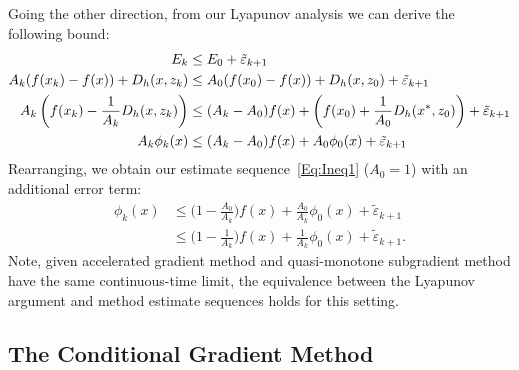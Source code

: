 \documentclass[11pt]{article}
\theoremstyle{plain}
\begin{document}
Going the other direction, from our Lyapunov analysis we can derive the following bound:
\begin{subequations}\label{Eq:EstSeqErr}
\begin{align}
E_k &\leq E_0 + \tilde \varepsilon_{k+1}\\
A_{k}(f(x_{k}) - f(x)) + D_h(x, z_{k}) &\leq A_0 (f(x_0) - f(x)) + D_h(x, z_0) + \tilde \varepsilon_{k+1}\notag\\
A_{k}\left(f(x_{k}) - \frac{1}{A_{k}}D_h(x, z_{k})\right) &\leq (A_k -  A_0) f(x) + \left(f(x_0)+ \frac{1}{A_0}  D_h(x^\ast, z_0)\right) + \tilde \varepsilon_{k+1}\notag \\
A_k \phi_k(x) &\leq (A_k -A_0) f(x) + A_0 \phi_0(x) + \tilde \varepsilon_{k+1}\label{Eq:EstSeq}
\end{align}
\end{subequations}
Rearranging, we obtain our estimate sequence~\eqref{Eq:Ineq1} ($A_0 = 1$) with an additional error term:
\begin{subequations}
\begin{align}
\phi_k(x) &\leq \Big(1 -\frac{A_0}{A_k}\Big) f(x) + \frac{A_0}{A_k} \phi_0(x) + \tilde \varepsilon_{k+1}\\
&\leq \Big(1 - \frac{1}{A_k}\Big)f(x) + \frac{1}{A_k}\phi_0(x)+ \tilde \varepsilon_{k+1}.
\end{align}
\end{subequations}
Note, given accelerated gradient method and quasi-monotone subgradient method have the same continuous-time limit, the equivalence between the Lyapunov argument and method estimate sequences holds for this setting.
\subsection{The Conditional Gradient Method}
\end{document}
